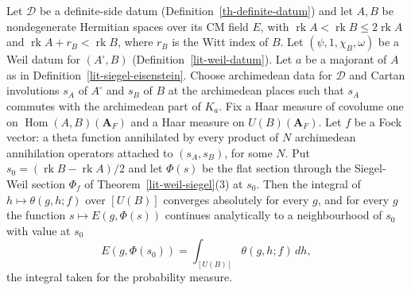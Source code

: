 \begin{theorem}\label{lit-siegel-weil}
Let $\mathcal D$ be a definite-side datum (Definition~\ref{th-definite-datum})
and let $A,B$ be nondegenerate Hermitian spaces over its CM field $E$, with
$\operatorname{rk}A<\operatorname{rk}B\le2\operatorname{rk}A$ and
$\operatorname{rk}A+r_B<\operatorname{rk}B$, where $r_B$ is the Witt index of
$B$. Let $(\psi,1,\chi_B,\omega)$ be a Weil datum for $(A^\square,B)$
(Definition~\ref{lit-weil-datum}). Let $a$ be a majorant of $A$ as in
Definition~\ref{lit-siegel-eisenstein}. Choose archimedean data for
$\mathcal D$ and Cartan involutions $s_A$ of $A^\square$ and $s_B$ of $B$ at
the archimedean places such that $s_A$ commutes with the archimedean part of
$K_a$. Fix a Haar measure of covolume one on
$\operatorname{Hom}(A,B)(\mathbf A_F)$ and a Haar measure on
$U(B)(\mathbf A_F)$. Let $f$ be a Fock vector: a theta function annihilated
by every product of $N$ archimedean annihilation operators attached to
$(s_A,s_B)$, for some $N$. Put $s_0=(\operatorname{rk}B-\operatorname{rk}A)/2$
and let $\Phi(s)$ be the flat section through the Siegel-Weil section
$\Phi_f$ of Theorem~\ref{lit-weil-siegel}(3) at $s_0$. Then the integral
of $h\mapsto\theta(g,h;f)$ over $[U(B)]$ converges absolutely for every $g$,
and for every $g$ the function $s\mapsto E(g,\Phi(s))$ continues analytically
to a neighbourhood of $s_0$ with value at $s_0$
\[
E(g,\Phi(s_0))=\int_{[U(B)]}\theta(g,h;f)\,dh,
\]
the integral taken for the probability measure.
\end{theorem}

